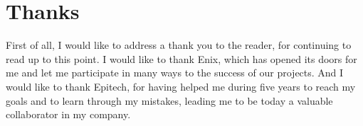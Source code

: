 \section*{Thanks}

First of all, I would like to address a thank you to the reader, for continuing to read up to this point. I would like to thank Enix, which has opened its doors for me and let me participate in many ways to the success of our projects. And I would like to thank Epitech, for having helped me during five years to reach my goals and to learn through my mistakes, leading me to be today a valuable collaborator in my company.

\clearpage
